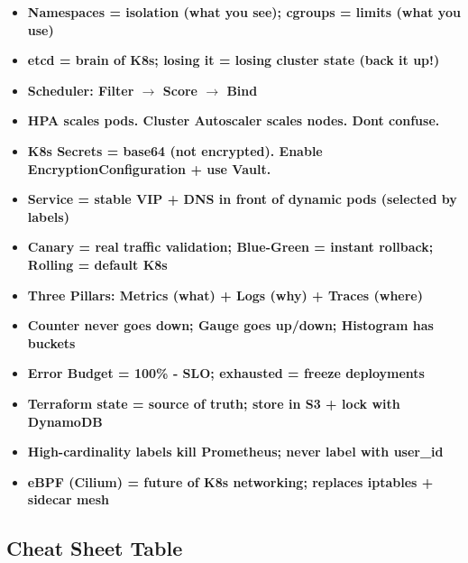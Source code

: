\documentclass[11pt]{article}
\providecommand{\tightlist}{\setlength{\itemsep}{1pt}\setlength{\parskip}{0pt}}
\begin{document}
\begin{itemize}
\tightlist
\item
  \textbf{Namespaces = isolation (what you see); cgroups = limits (what you use)}
\item
  \textbf{etcd = brain of K8s; losing it = losing cluster state (back it up!)}
\item
  \textbf{Scheduler: Filter \(\rightarrow\) Score \(\rightarrow\) Bind}
\item
  \textbf{HPA scales pods. Cluster Autoscaler scales nodes. Don\textquotesingle t confuse.}
\item
  \textbf{K8s Secrets = base64 (not encrypted). Enable EncryptionConfiguration + use Vault.}
\item
  \textbf{Service = stable VIP + DNS in front of dynamic pods (selected by labels)}
\item
  \textbf{Canary = real traffic validation; Blue-Green = instant rollback; Rolling = default K8s}
\item
  \textbf{Three Pillars: Metrics (what) + Logs (why) + Traces (where)}
\item
  \textbf{Counter never goes down; Gauge goes up/down; Histogram has buckets}
\item
  \textbf{Error Budget = 100\% - SLO; exhausted = freeze deployments}
\item
  \textbf{Terraform state = source of truth; store in S3 + lock with DynamoDB}
\item
  \textbf{High-cardinality labels kill Prometheus; never label with user\_id}
\item
  \textbf{eBPF (Cilium) = future of K8s networking; replaces iptables + sidecar mesh}
\end{itemize}

\subsection{Cheat Sheet Table}\label{cheat-sheet-table}
\end{document}
